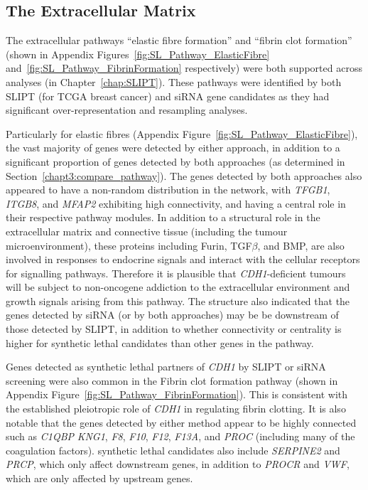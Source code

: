 \FloatBarrier


\subsection{The Extracellular Matrix}  \label{chapt4:SL_Genes_ECM}

The extracellular \glspl{pathway} ``elastic fibre formation'' and ``fibrin clot formation'' (shown in Appendix Figures~\ref{fig:SL_Pathway_ElasticFibre} and~\ref{fig:SL_Pathway_FibrinFormation} respectively) were both supported across analyses (in Chapter~\ref{chap:SLIPT}). These \glspl{pathway} were identified by both \gls{SLIPT} (for \gls{TCGA} breast cancer) and \gls{siRNA} gene candidates as they had significant over-representation and resampling analyses.


Particularly for elastic fibres (Appendix Figure~\ref{fig:SL_Pathway_ElasticFibre}), the vast majority of genes were detected by either approach, in addition to a significant proportion of genes detected by both approaches (as determined in Section~\ref{chapt3:compare_pathway}). The genes detected by both approaches also appeared to have a non-random distribution in the network, with \textit{TFGB1}, \textit{ITGB8}, and \textit{MFAP2} exhibiting high connectivity, and having a central role in their respective \gls{pathway} modules. In addition to a structural role in the extracellular matrix and connective tissue (including the tumour microenvironment), these proteins including Furin, TGF$\beta$, and BMP, are also involved in responses to endocrine signals and interact with the cellular receptors for signalling \glspl{pathway}. Therefore it is plausible that \textit{CDH1}-deficient tumours will be subject to \gls{non-oncogene addiction} to the extracellular environment and growth signals arising from this \gls{pathway}. The  structure also indicated that the genes detected by \gls{siRNA} (or by both approaches) may be be downstream of those detected by \gls{SLIPT}, in addition to whether connectivity or \gls{centrality} is higher for \gls{synthetic lethal} candidates than other genes in the \gls{pathway}.

Genes detected as \gls{synthetic lethal} partners of \textit{CDH1} by \gls{SLIPT} or \gls{siRNA} screening were also common in the Fibrin clot formation \gls{pathway} (shown in Appendix  Figure~\ref{fig:SL_Pathway_FibrinFormation}). This is consistent with the established pleiotropic role of \textit{CDH1} in regulating fibrin clotting. It is also notable that the genes detected by either method appear to be highly connected such as \textit{C1QBP} \textit{KNG1}, \textit{F8}, \textit{F10}, \textit{F12}, \textit{F13A}, and \textit{PROC} (including many of the coagulation factors). \Gls{synthetic lethal} candidates also include \textit{SERPINE2} and \textit{PRCP}, which only affect downstream genes, in addition to \textit{PROCR} and \textit{VWF}, which are only affected by upstream genes. 

